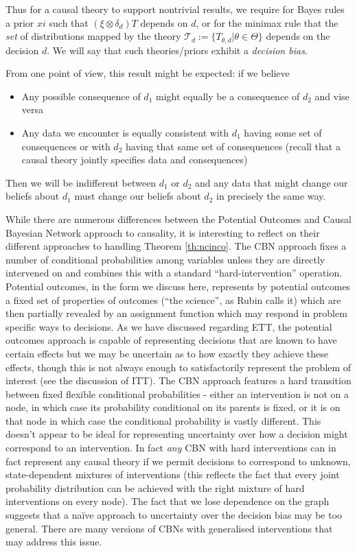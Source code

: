 Thus for a causal theory to support nontrivial results, we require for Bayes rules a prior $xi$ such that $(\xi\otimes \delta_d)T$ depends on $d$, or for the minimax rule that the \emph{set} of distributions mapped by the theory $\mathscr{T}_d:=\{T_{\theta,d}|\theta\in\Theta\}$ depends on the decision $d$. We will say that such theories/priors exhibit a \emph{decision bias}. 

From one point of view, this result might be expected: if we believe
\begin{itemize}
\item Any possible consequence of $d_1$ might equally be a consequence of $d_2$ and vise versa
\item Any data we encounter is equally consistent with $d_1$ having some set of consequences or with $d_2$ having that same set of consequences (recall that a causal theory jointly specifies data and consequences)
\end{itemize}
Then we will be indifferent between $d_1$ or $d_2$ and any data that might change our beliefs about $d_1$ must change our beliefs about $d_2$ in precisely the same way.

While there are numerous differences between the Potential Outcomes and Causal Bayesian Network approach to causality, it is interesting to reflect on their different approaches to handling Theorem \ref{th:ncinco}. The CBN approach fixes a number of conditional probabilities among variables unless they are directly intervened on and combines this with a standard ``hard-intervention'' operation. Potential outcomes, in the form we discuss here, represents by potential outcomes a fixed set of properties of outcomes (``the science'', as Rubin calls it) which are then partially revealed by an assignment function which may respond in problem specific ways to decisions. As we have discussed regarding ETT, the potential outcomes approach is capable of representing decisions that are known to have certain effects but we may be uncertain as to how exactly they achieve these effects, though this is not always enough to satisfactorily represent the problem of interest (see the discussion of ITT). The CBN approach features a hard transition between fixed flexible conditional probabilities - either an intervention is not on a node, in which case its probability conditional on its parents is fixed, or it is on that node in which case the conditional probability is vastly different. This doesn't appear to be ideal for representing uncertainty over how a decision might correspond to an intervention. In fact \emph{any} CBN with hard interventions can in fact represent any causal theory if we permit decisions to correspond to unknown, state-dependent mixtures of interventions (this reflects the fact that every joint probability distribution can be achieved with the right mixture of hard interventions on every node). The fact that we lose dependence on the graph suggests that a na\"ive approach to uncertainty over the decision bias may be too general. There are many versions of CBNs with generalised interventions that may address this issue.


